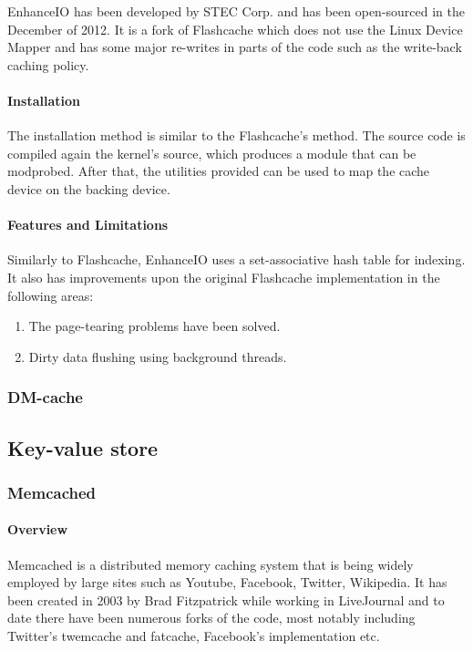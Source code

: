 EnhanceIO has been developed by STEC Corp. and has been open-sourced in the 
December of 2012. It is a fork of Flashcache which does not use the Linux 
Device Mapper and has some major re-writes in parts of the code such as the 
write-back caching policy.

\paragraph{Installation}

The installation method is similar to the Flashcache's method. The source code 
is compiled again the kernel's source, which produces a module that can be 
modprobed. After that, the utilities provided can be used to map the cache 
device on the backing device.

\paragraph{Features and Limitations}

Similarly to Flashcache, EnhanceIO uses a set-associative hash table for 
indexing. It also has improvements upon the original Flashcache implementation 
in the following areas:

\begin{enumerate}
	\item The page-tearing problems have been solved.
	\item Dirty data flushing using background threads.
\end{enumerate}

\subsubsection{DM-cache}

\subsection{Key-value store}

\subsubsection{Memcached}\label{sec:memcached-triad}

\paragraph{Overview}

Memcached is a distributed memory caching system that is being widely employed 
by large sites such as Youtube, Facebook, Twitter, Wikipedia. It has been 
created in 2003 by Brad Fitzpatrick while working in LiveJournal and to date 
there have been numerous forks of the code, most notably including Twitter's 
twemcache and fatcache, Facebook's implementation etc.

